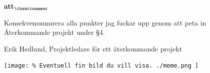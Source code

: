 \documentclass[a4paper]{article}
\begin{document}
\begin{list}{\bf att$_{\theattnummer}$}{}

\item Konsekvensnumrera alla punkter jag fuckar upp genom att peta in Återkommande projekt under \S4.
\end{list}

\vspace{2cm}
\noindent
Erik Hedlund, Projektledare för ett återkommande projekt

\begin{center}
\texttt{[image: 
    \% Eventuell fin bild du vill visa.
    ./meme.png
]}
\end{center}
\end{document}
